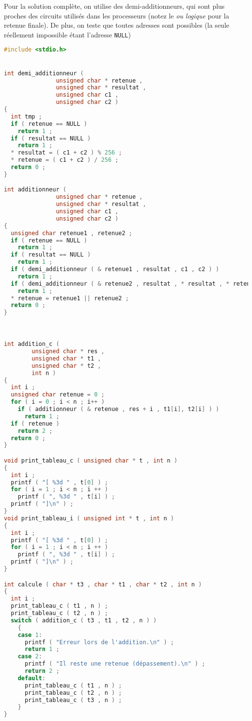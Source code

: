 \begin{solutioncachee}
  Pour la solution complète, on utilise des demi-additionneurs, qui
  sont plus proches des circuits utilisés dans les processeurs (notez
  le \emph{ou logique} pour la retenue finale). De plus, on teste que
  toutes adresses sont possibles (la seule réellement impossible étant 
  l'adresse \texttt{NULL})
  \begin{lstlisting}[language=C]
#include <stdio.h>


int demi_additionneur (
		       unsigned char * retenue ,
		       unsigned char * resultat ,
		       unsigned char c1 ,
		       unsigned char c2 )
{
  int tmp ;
  if ( retenue == NULL )
    return 1 ;
  if ( resultat == NULL )
    return 1 ;
  * resultat = ( c1 + c2 ) % 256 ;
  * retenue = ( c1 + c2 ) / 256 ;
  return 0 ;
}

int additionneur (
		       unsigned char * retenue ,
		       unsigned char * resultat ,
		       unsigned char c1 ,
		       unsigned char c2 )
{
  unsigned char retenue1 , retenue2 ;
  if ( retenue == NULL )
    return 1 ;
  if ( resultat == NULL )
    return 1 ;
  if ( demi_additionneur ( & retenue1 , resultat , c1 , c2 ) )
    return 1 ;
  if ( demi_additionneur ( & retenue2 , resultat , * resultat , * retenue ) )
    return 1 ;
  * retenue = retenue1 || retenue2 ;
  return 0 ;
}



int addition_c (
		unsigned char * res ,
		unsigned char * t1 ,
		unsigned char * t2 ,
		int n )
{
  int i ;
  unsigned char retenue = 0 ;
  for ( i = 0 ; i < n ; i++ )
    if ( additionneur ( & retenue , res + i , t1[i], t2[i] ) )
      return 1 ;
  if ( retenue )
    return 2 ;
  return 0 ;
}

void print_tableau_c ( unsigned char * t , int n )
{
  int i ;
  printf ( "[ %3d " , t[0] ) ;
  for ( i = 1 ; i < n ; i ++ )
    printf ( ", %3d " , t[i] ) ;
  printf ( "]\n" ) ;
}
void print_tableau_i ( unsigned int * t , int n )
{
  int i ;
  printf ( "[ %3d " , t[0] ) ;
  for ( i = 1 ; i < n ; i ++ )
    printf ( ", %3d " , t[i] ) ;
  printf ( "]\n" ) ;
}

int calcule ( char * t3 , char * t1 , char * t2 , int n )
{
  int i ;
  print_tableau_c ( t1 , n ) ;
  print_tableau_c ( t2 , n ) ;
  switch ( addition_c ( t3 , t1 , t2 , n ) )
    {
    case 1:
      printf ( "Erreur lors de l'addition.\n" ) ;
      return 1 ;
    case 2:
      printf ( "Il reste une retenue (dépassement).\n" ) ;
      return 2 ;
    default:
      print_tableau_c ( t1 , n ) ;
      print_tableau_c ( t2 , n ) ;
      print_tableau_c ( t3 , n ) ;
    }
}


\end{lstlisting}
\end{solutioncachee}
